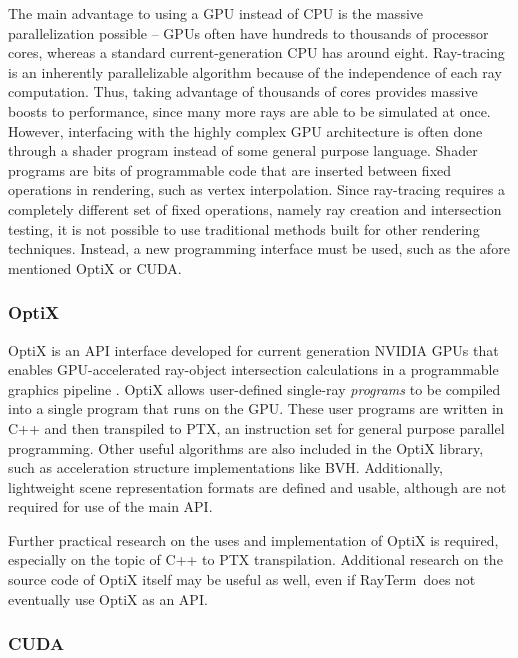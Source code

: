 \documentclass[11pt]{article}
\newcommand{\name}{{\sc RayTerm}}
\begin{document}
The main advantage to using a GPU instead of CPU is the massive parallelization possible -- GPUs often have hundreds to thousands of processor cores, whereas a standard current-generation CPU has around eight.
Ray-tracing is an inherently parallelizable algorithm because of the independence of each ray computation.
Thus, taking advantage of thousands of cores provides massive boosts to performance, since many more rays are able to be simulated at once.
However, interfacing with the highly complex GPU architecture is often done through a shader program instead of some general purpose language.
Shader programs are bits of programmable code that are inserted between fixed operations in rendering, such as vertex interpolation.
Since ray-tracing requires a completely different set of fixed operations, namely ray creation and intersection testing, it is not possible to use traditional methods built for other rendering techniques.
Instead, a new programming interface must be used, such as the afore mentioned OptiX or CUDA.

\subsubsection{OptiX}
\label{sec:method:optix}

OptiX is an API interface developed for current generation NVIDIA GPUs that enables GPU-accelerated ray-object intersection calculations in a programmable graphics pipeline \cite{parker2010optix}.
OptiX allows user-defined single-ray {\it programs} to be compiled into a single program that runs on the GPU.
These user programs are written in C++ and then transpiled to PTX, an instruction set for general purpose parallel programming.
Other useful algorithms are also included in the OptiX library, such as acceleration structure implementations like BVH.
Additionally, lightweight scene representation formats are defined and usable, although are not required for use of the main API.

Further practical research on the uses and implementation of OptiX is required, especially on the topic of C++ to PTX transpilation.
Additional research on the source code of OptiX itself may be useful as well, even if \name\ does not eventually use OptiX as an API.

\subsubsection{CUDA}
\label{sec:method:cuda}
\end{document}
